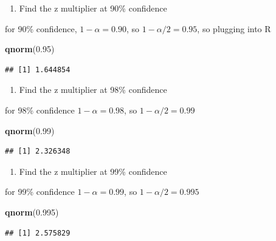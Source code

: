\documentclass[
  openany]{book}
\newenvironment{Shaded}{\begin{snugshade}}{\end{snugshade}}
\newcommand{\FloatTok}[1]{\textcolor[rgb]{0.00,0.00,0.81}{#1}}
\newcommand{\FunctionTok}[1]{\textcolor[rgb]{0.13,0.29,0.53}{\textbf{#1}}}
\newcommand{\NormalTok}[1]{#1}
\providecommand{\tightlist}{%
  \setlength{\itemsep}{0pt}\setlength{\parskip}{0pt}}
\begin{document}
\begin{enumerate}
\def\labelenumi{\arabic{enumi}.}
\tightlist
\item
  Find the z multiplier at 90\% confidence
\end{enumerate}

for 90\% confidence, \(1-\alpha=0.90\), so \(1-\alpha/2=0.95\), so plugging into R

\begin{Shaded}
\begin{Highlighting}[]
\FunctionTok{qnorm}\NormalTok{(}\FloatTok{0.95}\NormalTok{)}
\end{Highlighting}
\end{Shaded}

\begin{verbatim}
## [1] 1.644854
\end{verbatim}

\begin{enumerate}
\def\labelenumi{\arabic{enumi}.}
\setcounter{enumi}{1}
\tightlist
\item
  Find the z multiplier at 98\% confidence
\end{enumerate}

for 98\% confidence \(1-\alpha=0.98\), so \(1-\alpha/2=0.99\)

\begin{Shaded}
\begin{Highlighting}[]
\FunctionTok{qnorm}\NormalTok{(}\FloatTok{0.99}\NormalTok{)}
\end{Highlighting}
\end{Shaded}

\begin{verbatim}
## [1] 2.326348
\end{verbatim}

\begin{enumerate}
\def\labelenumi{\arabic{enumi}.}
\setcounter{enumi}{2}
\tightlist
\item
  Find the z multiplier at 99\% confidence
\end{enumerate}

for 99\% confidence \(1-\alpha=0.99\), so \(1-\alpha/2=0.995\)

\begin{Shaded}
\begin{Highlighting}[]
\FunctionTok{qnorm}\NormalTok{(}\FloatTok{0.995}\NormalTok{)}
\end{Highlighting}
\end{Shaded}

\begin{verbatim}
## [1] 2.575829
\end{verbatim}
\end{document}
